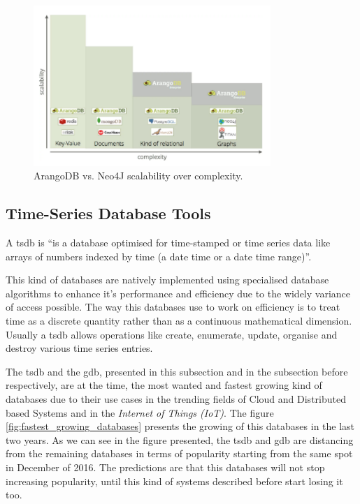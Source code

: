 \begin{figure}[H]
    \centering
    \includegraphics[width=0.80\textwidth]{images/arangodb_vs_neo4j_scalability.pdf}
    \caption{ArangoDB vs. Neo4J scalability over complexity.}
    \label{fig:arangodb_vs_neo4j_scalability}
\end{figure}

\subsection{Time-Series Database Tools}
\label{subsec:time_series_database_tools}


A \gls{tsdb} is ``is a database optimised for time-stamped or time series data like arrays of numbers indexed by time (a date time or a date time range)''\cite{time_series_database_definition}.

This kind of databases are natively implemented using specialised database algorithms to enhance it's performance and efficiency due to the widely variance of access possible. The way this databases use to work on efficiency is to treat time as a discrete quantity rather than as a continuous mathematical dimension. Usually a \gls{tsdb} allows operations like create, enumerate, update, organise and destroy various time series entries.

The \gls{tsdb} and the \gls{gdb}, presented in this subsection and in the subsection before respectively, are at the time, the most wanted and fastest growing kind of databases due to their use cases in the trending fields of Cloud and Distributed based Systems and in the \textit{Internet of Things (IoT)}. The figure \ref{fig:fastest_growing_databases} presents the growing of this databases in the last two years. As we can see in the figure presented, the \gls{tsdb} and \gls{gdb} are distancing from the remaining databases in terms of popularity starting from the same spot in December of 2016. The predictions are that this databases will not stop increasing popularity, until this kind of systems described before start losing it too.

